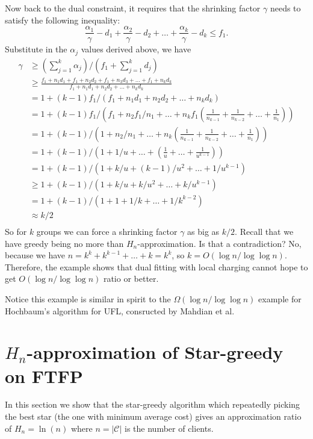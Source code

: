 \documentclass[11pt]{article}
\begin{document}
Now back to the dual constraint, it requires that the shrinking factor
$\gamma$ needs to satisfy the following inequality:
\begin{equation}
  \frac{\alpha_1}{\gamma} - d_1 + \frac{\alpha_2}{\gamma} - d_2 +
  \ldots + \frac{\alpha_k}{\gamma} - d_k \leq f_1.
\end{equation}
Substitute in the $\alpha_j$ values derived above, we have
\begin{align*}
  \gamma &\geq (\sum_{j=1}^k \alpha_j) / (f_1 + \sum_{j=1}^k d_j)\\
  &\geq \frac{f_1 + n_1 d_1 + f_1 + n_2 d_2 + f_1 + n_3 d_3 + \ldots +
    f_1 + n_k
    d_k}{f_1 + n_1 d_1 + n_2 d_2 + \ldots + n_k d_k}\\
  &= 1 + (k-1)f_1 / (f_1 + n_1 d_1 + n_2 d_2 + \ldots + n_k d_k)\\
  &= 1 + (k-1)f_1 / \left(f_1 + n_2 f_1 / n_1 + \ldots + n_k f_1
    (\frac{1}{n_{k-1}} + \frac{1}{n_{k-2}} + \ldots +
    \frac{1}{n_1})\right)\\
  &= 1 + (k-1) / \left(1 + n_2 / n_1 + \ldots + n_k
    (\frac{1}{n_{k-1}} + \frac{1}{n_{k-2}} + \ldots +
    \frac{1}{n_1})\right)\\
  &= 1 + (k-1) / \left(1 + 1/u + \ldots + (\frac{1}{u} + \ldots +
    \frac{1}{u^{k-1}})\right)\\
  &= 1 + (k-1) / \left(1 + k/u + (k-1)/u^2 + \ldots +
    1/u^{k-1}\right)\\
  &\geq 1 + (k-1) / \left(1 + k/u + k/u^2 + \ldots +
    k/u^{k-1}\right)\\
  &= 1 + (k-1) / \left(1 + 1 + 1/k + \ldots + 1/k^{k-2}\right)\\
  &\approx k/2\\
\end{align*}
So for $k$ groups we can force a shrinking factor $\gamma$ as big as
$k/2$. Recall that we have greedy being no more than
$H_n$-approximation. Is that a contradiction? No, because we have
$n=k^k + k^{k-1} + \ldots + k = k^k$, so $k = O(\log n / \log\log
n)$. Therefore, the example shows that dual fitting with local
charging cannot hope to get $O(\log n / \log\log n)$ ratio or better.

Notice this example is similar in spirit to the $\Omega(\log n/
\log\log n)$ example for Hochbaum's algorithm for UFL, consructed by
Mahdian et al.

\section{$H_n$-approximation of Star-greedy on FTFP}
\label{sec:upp}
In this section we show that the star-greedy algorithm which
repeatedly picking the best star (the one with minimum
average cost) gives an approximation ratio of $H_n = \ln(n)$
where $n=|\mathcal{C}|$ is the number of clients.
\end{document}
